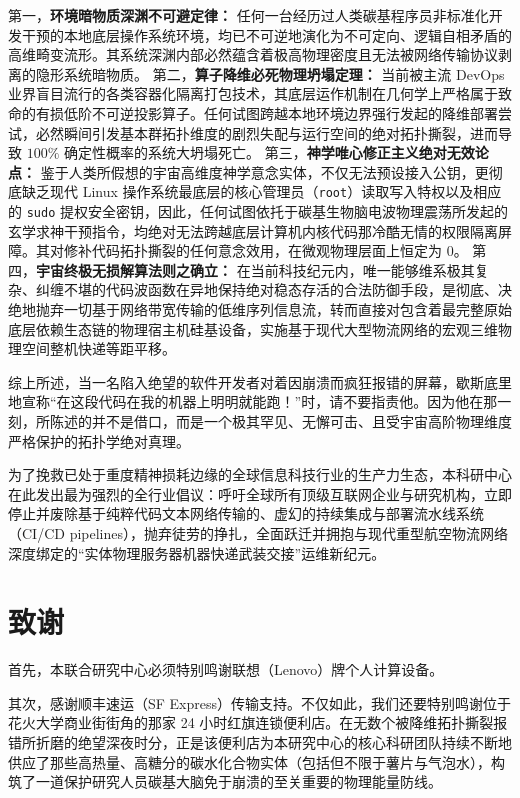 \documentclass[journal]{IEEEtran}
\begin{document}
第一，\textbf{环境暗物质深渊不可避定律：} 任何一台经历过人类碳基程序员非标准化开发干预的本地底层操作系统环境，均已不可逆地演化为不可定向、逻辑自相矛盾的高维畸变流形。其系统深渊内部必然蕴含着极高物理密度且无法被网络传输协议剥离的隐形系统暗物质。
第二，\textbf{算子降维必死物理坍塌定理：} 当前被主流 DevOps 业界盲目流行的各类容器化隔离打包技术，其底层运作机制在几何学上严格属于致命的有损低阶不可逆投影算子。任何试图跨越本地环境边界强行发起的降维部署尝试，必然瞬间引发基本群拓扑维度的剧烈失配与运行空间的绝对拓扑撕裂，进而导致 $100\%$ 确定性概率的系统大坍塌死亡。
第三，\textbf{神学唯心修正主义绝对无效论点：} 鉴于人类所假想的宇宙高维度神学意念实体，不仅无法预设接入公钥，更彻底缺乏现代 Linux 操作系统最底层的核心管理员（\texttt{root}）读取写入特权以及相应的 \texttt{sudo} 提权安全密钥，因此，任何试图依托于碳基生物脑电波物理震荡所发起的玄学求神干预指令，均绝对无法跨越底层计算机内核代码那冷酷无情的权限隔离屏障。其对修补代码拓扑撕裂的任何意念效用，在微观物理层面上恒定为 $0$。
第四，\textbf{宇宙终极无损解算法则之确立：} 在当前科技纪元内，唯一能够维系极其复杂、纠缠不堪的代码波函数在异地保持绝对稳态存活的合法防御手段，是彻底、决绝地抛弃一切基于网络带宽传输的低维序列信息流，转而直接对包含着最完整原始底层依赖生态链的物理宿主机硅基设备，实施基于现代大型物流网络的宏观三维物理空间整机快递等距平移。

综上所述，当一名陷入绝望的软件开发者对着因崩溃而疯狂报错的屏幕，歇斯底里地宣称“在这段代码在我的机器上明明就能跑！”时，请不要指责他。因为他在那一刻，所陈述的并不是借口，而是一个极其罕见、无懈可击、且受宇宙高阶物理维度严格保护的拓扑学绝对真理。

为了挽救已处于重度精神损耗边缘的全球信息科技行业的生产力生态，本科研中心在此发出最为强烈的全行业倡议：呼吁全球所有顶级互联网企业与研究机构，立即停止并废除基于纯粹代码文本网络传输的、虚幻的持续集成与部署流水线系统（CI/CD pipelines），抛弃徒劳的挣扎，全面跃迁并拥抱与现代重型航空物流网络深度绑定的“实体物理服务器机器快递武装交接”运维新纪元。

\section*{致谢}

首先，本联合研究中心必须特别鸣谢联想（Lenovo）牌个人计算设备。

其次，感谢顺丰速运（SF Express）传输支持。不仅如此，我们还要特别鸣谢位于花火大学商业街街角的那家 24 小时红旗连锁便利店。在无数个被降维拓扑撕裂报错所折磨的绝望深夜时分，正是该便利店为本研究中心的核心科研团队持续不断地供应了那些高热量、高糖分的碳水化合物实体（包括但不限于薯片与气泡水），构筑了一道保护研究人员碳基大脑免于崩溃的至关重要的物理能量防线。
\end{document}
